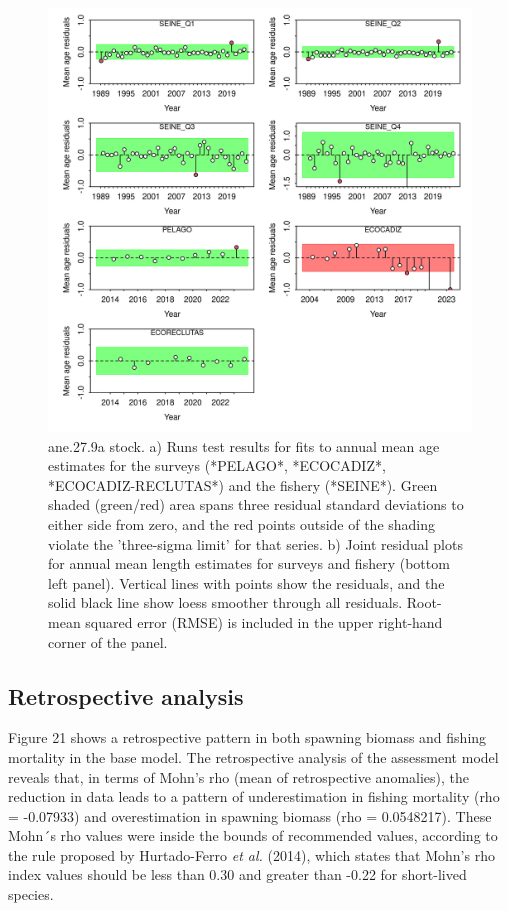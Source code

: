 \documentclass[
]{article}
\begin{document}
\begin{figure}[H]

{\centering \includegraphics[width=0.95\linewidth]{report/run/S1.0_4FLEETS/fig_runtest_residuals_age} 

}

\caption{ane.27.9a stock. a) Runs test results for fits to annual mean age estimates for the surveys (*PELAGO*, *ECOCADIZ*, *ECOCADIZ-RECLUTAS*) and the fishery (*SEINE*). Green shaded (green/red) area spans three residual standard deviations to either side from zero, and the red points outside of the shading violate the 'three-sigma limit' for that series.  b) Joint residual plots for annual mean length estimates for surveys and fishery (bottom left panel).  Vertical lines with points show the residuals, and the solid black line show loess smoother through all residuals. Root-mean squared error (RMSE) is included in the upper right-hand corner of the panel.}\label{fig:unnamed-chunk-28}
\end{figure}

\hypertarget{retrospective-analysis}{%
\subsection{Retrospective analysis}\label{retrospective-analysis}}

Figure 21 shows a retrospective pattern in both spawning biomass and
fishing mortality in the base model. The retrospective analysis of the
assessment model reveals that, in terms of Mohn's rho (mean of
retrospective anomalies), the reduction in data leads to a pattern of
underestimation in fishing mortality (rho = -0.07933) and overestimation
in spawning biomass (rho = 0.0548217). These Mohn´s rho values were
inside the bounds of recommended values, according to the rule proposed
by Hurtado-Ferro \emph{et al.} (2014), which states that Mohn's rho
index values should be less than 0.30 and greater than -0.22 for
short-lived species.
\end{document}
